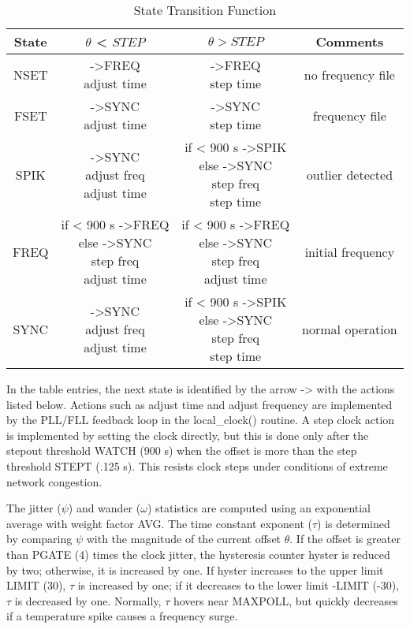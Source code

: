 \begin{table}[htb]
\center
\begin{tabular}{c | c | c | c}
State & $ \theta $ < $ STEP $        & $ \theta > STEP $      & Comments \\
\hline
\hline
NSET & \makecell{->FREQ \\ adjust time} & \makecell{->FREQ \\ step time} & no frequency file \\
FSET & \makecell{->SYNC \\ adjust time} & \makecell{->SYNC \\ step time} & frequency file \\
SPIK & \makecell{->SYNC \\ adjust freq \\ adjust time} & \makecell{if < 900 s ->SPIK \\ else ->SYNC \\ step freq \\ step time} & outlier detected \\
FREQ & \makecell{if < 900 s ->FREQ \\ else ->SYNC \\ step freq \\ adjust time} & \makecell{if < 900 s ->FREQ \\ else ->SYNC \\ step freq \\ adjust time} & initial frequency \\
SYNC & \makecell{->SYNC \\ adjust freq \\ adjust time} & \makecell{if < 900 s ->SPIK \\ else ->SYNC \\ step freq \\ step time} & normal operation \\
\hline
\end{tabular}
\label{state_transition_function}
\caption{State Transition Function}
\end{table}

In the table entries, the next state is identified by the arrow ->
with the actions listed below.  Actions such as adjust time and
adjust frequency are implemented by the PLL/FLL feedback loop in the
local\_clock() routine.  A step clock action is implemented by setting
the clock directly, but this is done only after the stepout threshold
WATCH (900 s) when the offset is more than the step threshold STEPT
(.125 s).  This resists clock steps under conditions of extreme
network congestion.

The jitter ($ \psi $) and wander ($ \omega $) statistics are computed using an
exponential average with weight factor AVG.  The time constant
exponent ($ \tau $) is determined by comparing $ \psi $ with the magnitude of
the current offset $ \theta $.  If the offset is greater than PGATE (4)
times the clock jitter, the hysteresis counter hyster is reduced by
two; otherwise, it is increased by one.  If hyster increases to the
upper limit LIMIT (30), $ \tau $ is increased by one; if it decreases to
the lower limit -LIMIT (-30), $ \tau $ is decreased by one.  Normally, $ \tau $
hovers near MAXPOLL, but quickly decreases if a temperature spike
causes a frequency surge.
